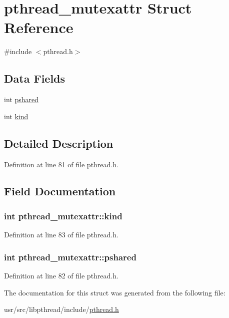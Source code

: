 \hypertarget{structpthread__mutexattr}{\section{pthread\+\_\+mutexattr Struct Reference}
\label{structpthread__mutexattr}
}


{\ttfamily \#include $<$pthread.\+h$>$}

\subsection*{Data Fields}
\begin{DoxyCompactItemize}
\item 
int \hyperlink{structpthread__mutexattr_a886b6893f8e2ac727baa10ae3d5433a8}{pshared}
\item 
int \hyperlink{structpthread__mutexattr_a8f33b94daf83faf08982414db0b16a0c}{kind}
\end{DoxyCompactItemize}


\subsection{Detailed Description}


Definition at line 81 of file pthread.\+h.



\subsection{Field Documentation}
\hypertarget{structpthread__mutexattr_a8f33b94daf83faf08982414db0b16a0c}{
\subsubsection[{kind}]{\setlength{\rightskip}{0pt plus 5cm}int pthread\+\_\+mutexattr\+::kind}}\label{structpthread__mutexattr_a8f33b94daf83faf08982414db0b16a0c}


Definition at line 83 of file pthread.\+h.

\hypertarget{structpthread__mutexattr_a886b6893f8e2ac727baa10ae3d5433a8}{
\subsubsection[{pshared}]{\setlength{\rightskip}{0pt plus 5cm}int pthread\+\_\+mutexattr\+::pshared}}\label{structpthread__mutexattr_a886b6893f8e2ac727baa10ae3d5433a8}


Definition at line 82 of file pthread.\+h.



The documentation for this struct was generated from the following file\+:\begin{DoxyCompactItemize}
\item 
usr/src/libpthread/include/\hyperlink{pthread_8h}{pthread.\+h}\end{DoxyCompactItemize}
